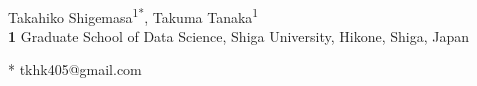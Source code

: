 \documentclass[10pt,letterpaper]{article}
\begin{document}
\vspace*{0.2in}

\begin{flushleft}
{\Large
\textbf{}
}
\newline
\\
Takahiko Shigemasa\textsuperscript{1*},
Takuma Tanaka\textsuperscript{1}
\\
\bigskip
\textbf{1} Graduate School of Data Science, Shiga University, Hikone, Shiga, Japan
\\
\bigskip

* tkhk405@gmail.com

\end{flushleft}


\end{document}
